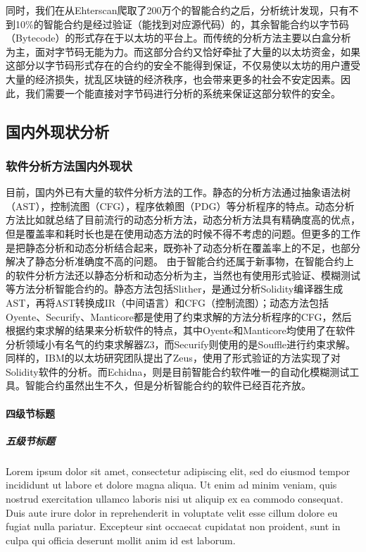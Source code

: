 同时，我们在从Ehterscan爬取了200万个的智能合约之后，分析统计发现，只有不到10\%的智能合约是经过验证（能找到对应源代码）的，其余智能合约以字节码（Bytecode）的形式存在于以太坊的平台上。而传统的分析方法主要以白盒分析为主，面对字节码无能为力。而这部分合约又恰好牵扯了大量的以太坊资金，如果这部分以字节码形式存在的合约的安全不能得到保证，不仅易使以太坊的用户遭受大量的经济损失，扰乱区块链的经济秩序，也会带来更多的社会不安定因素。因此，我们需要一个能直接对字节码进行分析的系统来保证这部分软件的安全。

\subsection{国内外现状分析}



\subsubsection{软件分析方法国内外现状}

目前，国内外已有大量的软件分析方法的工作。静态的分析方法通过抽象语法树（AST），控制流图（CFG），程序依赖图（PDG）等分析程序的特点。动态分析方法比如\cite{survey-dynamic}就总结了目前流行的动态分析方法，动态分析方法具有精确度高的优点，但是覆盖率和耗时长也是在使用动态方法的时候不得不考虑的问题。但更多的工作是把静态分析和动态分析结合起来，既弥补了动态分析在覆盖率上的不足，也部分解决了静态分析准确度不高的问题。
由于智能合约还属于新事物，在智能合约上的软件分析方法还以静态分析和动态分析为主，当然也有使用形式验证、模糊测试等方法分析智能合约的。静态方法包括Slither\cite{slither}，是通过分析Solidity编译器生成AST，再将AST转换成IR（中间语言）和CFG（控制流图）；动态方法包括Oyente\cite{oyente}、Securify\cite{securify}、Manticore\cite{manticore}都是使用了约束求解的方法分析程序的CFG，然后根据约束求解的结果来分析软件的特点，其中Oyente和Manticore均使用了在软件分析领域小有名气的约束求解器Z3\cite{z3}，而Securify则使用的是Souffle\cite{souffle}进行约束求解。同样的，IBM的以太坊研究团队提出了Zeus\cite{zeus}，使用了形式验证的方法实现了对Solidity软件的分析。而Echidna\cite{echidna}，则是目前智能合约软件唯一的自动化模糊测试工具。智能合约虽然出生不久，但是分析智能合约的软件已经百花齐放。


\paragraph{四级节标题}

\subparagraph{五级节标题}

Lorem ipsum dolor sit amet, consectetur adipiscing elit, sed do eiusmod tempor
incididunt ut labore et dolore magna aliqua.
Ut enim ad minim veniam, quis nostrud exercitation ullamco laboris nisi ut
aliquip ex ea commodo consequat.
Duis aute irure dolor in reprehenderit in voluptate velit esse cillum dolore eu
fugiat nulla pariatur.
Excepteur sint occaecat cupidatat non proident, sunt in culpa qui officia
deserunt mollit anim id est laborum.



